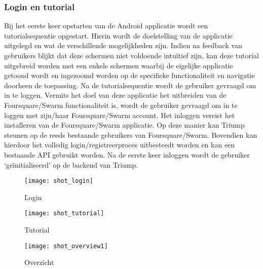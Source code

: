 \subsubsection{Login en tutorial} %
Bij het eerste keer opstarten van de Android applicatie wordt een tutorialsequentie opgestart. Hierin wordt de doelstelling van de applicatie uitgelegd en wat de verschillende mogelijkheden zijn. Indien na feedback van gebruikers blijkt dat deze schermen niet voldoende intuïtief zijn, kan deze tutorial uitgebreid worden met een enkele schermen waarbij de eigelijke applicatie getoond wordt en ingezoomd worden op de specifieke functionaliteit en navigatie doorheen de toepassing. 
Na de tutorialsequentie wordt de gebruiker gevraagd om in te loggen. Vermits het doel van deze applicatie het uitbreiden van de Foursquare/Swarm functionaliteit is, wordt de gebruiker gevraagd om in te loggen met zijn/haar Foursquare/Swarm account. Het inloggen vereist het installeren van de Foursquare/Swarm applicatie. Op deze manier kan Triump steunen op de reeds bestaande gebruikers van Foursquare/Swarm. Bovendien kan hierdoor het volledig login/registreerproces uitbesteedt worden en kan een bestaande API gebruikt worden.
Na de eerste keer inloggen wordt de gebruiker `geïnitialiseerd' op de backend van Triump.
\begin{figure}[ht]
\begin{minipage}[b]{0.20\linewidth}
\centering
\texttt{[image: shot\_login]}
\caption{Login}
\label{fig:screenshot_profile}
\end{minipage}
\hspace{2.4cm}
\begin{minipage}[b]{0.20\linewidth}
\centering
\texttt{[image: shot\_tutorial]}
\caption{Tutorial}
\label{fig:screenshot_login}
\end{minipage}
\hspace{2.4cm}
\begin{minipage}[b]{0.20\linewidth}
\centering
\texttt{[image: shot\_overview1]}
\caption{Overzicht}
\label{fig:screenshot_overview}
\end{minipage}
\end{figure}
\clearpage
